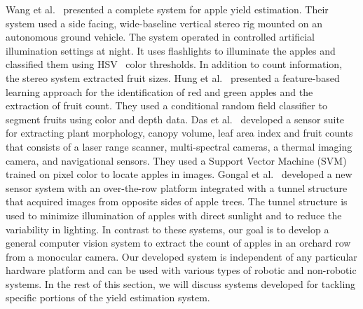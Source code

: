 Wang et al.~\cite{wang} presented a complete system for apple yield estimation. Their system used a side facing, wide-baseline vertical stereo rig mounted on an autonomous ground vehicle. The system operated in controlled artificial illumination settings at night. It uses flashlights to illuminate the apples and classified them using HSV~\cite{hsvcolor} color thresholds. In addition to count information, the stereo system extracted fruit sizes. Hung et al.~\cite{hung2015feature} presented a feature-based learning approach for the identification of red and green apples and the extraction of fruit count. They used a conditional random field classifier to segment fruits using color and depth data. Das et al.~\cite{das2015devices} developed a sensor suite for extracting plant morphology, canopy volume, leaf area index and fruit counts that consists of a laser range scanner, multi-spectral cameras, a thermal imaging camera, and navigational sensors. They used a Support Vector Machine (SVM) trained on pixel color to locate apples in images. Gongal et al.~\cite{gongal2016apple}  developed a new sensor system with an over-the-row platform integrated with a tunnel structure that acquired images from opposite sides of apple trees. The tunnel structure is used to minimize illumination of apples with direct sunlight and to reduce the variability in lighting. In contrast to these systems, our goal is to develop a general computer vision system to extract the count of apples in an orchard row from a monocular camera. Our developed system is independent of any particular hardware platform and can be used with various types of robotic and non-robotic systems. In the rest of this section, we will discuss systems developed for tackling specific portions of the yield estimation system.

